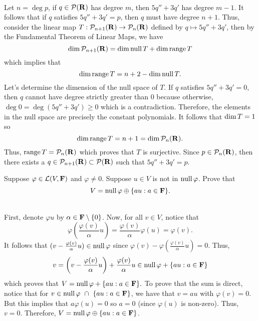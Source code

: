 \begin{solution}
    \\ Let $n = \deg p$, if $q \in \mathcal{P}(\mathbf{R})$ has degree $m$, then $5q'' + 3q'$ has degree $m-1$. It follows that if $q$ satisfies $5q'' + 3q' = p$, then $q$ must have degree $n+1$. Thus, consider the linear map $T : \mathcal{P}_{n+1}(\mathbf{R}) \to \mathcal{P}_n(\mathbf{R})$ defined by $q \mapsto 5q'' + 3q'$, then by the Fundamental Theorem of Linear Maps, we have
    $$\dim \mathcal{P}_{n+1}(\mathbf{R}) = \dim \operatorname{\text{null}} T + \dim \operatorname{\text{range}} T$$
    which implies that
    $$\dim \operatorname{\text{range}} T = n+2 - \dim \operatorname{\text{null}} T.$$
    Let's determine the dimension of the null space of $T$. If $q$ satisfies $5q'' + 3q' = 0$, then $q$ cannot have degree strictly greater than 0 because otherwise, $\deg 0 = \deg (5q'' + 3q') \geq 0$ which is a contradiction. Therefore, the elements in the null space are precisely the constant polynomials. It follows that $\dim \null T = 1$ so
    $$\dim \operatorname{\text{range}} T = n+1 = \dim \mathcal{P}_n(\mathbf{R}).$$
    Thus, $\operatorname{\text{range}} T = \mathcal{P}_n(\mathbf{R})$ which proves that $T$ is surjective. Since $p \in \mathcal{P}_n(\mathbf{R})$, then there exists a $q \in \mathcal{P}_{n+1}(\mathbf{R}) \subset \mathcal{P}(\mathbf{R})$ such that $5q'' + 3q' = p$. \\
\end{solution}

\begin{exercise}
    Suppose $\varphi \in \mathcal{L}(V, \mathbf{F})$ and $\varphi \neq 0$. Suppose $u \in V$ is not in $\operatorname{\text{null}} \varphi$. Prove that
    $$V = \operatorname{\text{null}} \varphi \oplus \{au : a \in \mathbf{F}\}.$$
\end{exercise}

\begin{solution}
    \\ First, denote $\varphi u$ by $\alpha \in \mathbf{F}\setminus \{0\}$. Now, for all $v \in V$, notice that
    $$\varphi\left(\frac{\varphi(v)}{\alpha} u\right) = \frac{\varphi(v)}{\alpha}\varphi(u) = \varphi(v).$$
    It follows that $(v - \frac{\varphi(v)}{\alpha}u) \in \operatorname{\text{null}} \varphi$ since $\varphi(v)  - \varphi(\frac{\varphi(v)}{\alpha}u) = 0$. Thus,
    $$v = \left(v - \frac{\varphi(v)}{\alpha}u\right) + \frac{\varphi(v)}{\alpha}u \in \operatorname{\text{null}} \varphi + \{au: a \in \mathbf{F}\}$$
    which proves that $V = \operatorname{\text{null}} \varphi + \{au : a \in \mathbf{F}\}.$ To prove that the sum is direct, notice that for $v \in \operatorname{\text{null}} \varphi \ \cap \ \{au : a \in \mathbf{F}\}$, we have that $v = au$ with $\varphi(v) = 0$. But this implies that $a \varphi(u) = 0$ so $a = 0$ (since $\varphi(u)$ is non-zero). Thus, $v = 0$. Therefore, $V = \operatorname{\text{null}} \varphi \oplus \{au : a \in \mathbf{F}\}$.\\
\end{solution}

